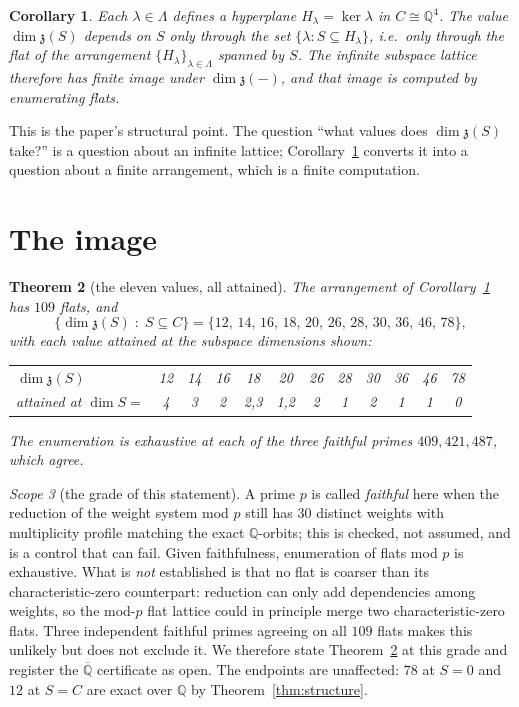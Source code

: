 \documentclass[11pt,a4paper]{article}
\newtheorem{theorem}{Theorem}[section]
\newtheorem{corollary}[theorem]{Corollary}
\theoremstyle{definition}
\theoremstyle{remark}
\newtheorem{scope}[theorem]{Scope}
\newcommand{\z}{\mathfrak{z}}
\newcommand{\Q}{\mathbb{Q}}
\begin{document}
\begin{corollary}\label{cor:arrangement}
Each $\lambda\in\Lambda$ defines a hyperplane $H_\lambda=\ker\lambda$ in $C\cong\Q^4$. The
value $\dim\z(S)$ depends on $S$ only through the set $\{\lambda:S\subseteq H_\lambda\}$, i.e.\
only through the flat of the arrangement $\{H_\lambda\}_{\lambda\in\Lambda}$ spanned by $S$.
The infinite subspace lattice therefore has finite image under $\dim\z(-)$, and that image is
computed by enumerating flats.
\end{corollary}

This is the paper's structural point. The question ``what values does $\dim\z(S)$ take?'' is a
question about an infinite lattice; Corollary~\ref{cor:arrangement} converts it into a question
about a finite arrangement, which is a finite computation.

\section{The image}\label{sec:image}

\begin{theorem}[the eleven values, all attained]\label{thm:spectrum}
The arrangement of Corollary~\ref{cor:arrangement} has $109$ flats, and
\[
   \bigl\{\dim\z(S)\;:\;S\subseteq C\bigr\}
   =\{12,\,14,\,16,\,18,\,20,\,26,\,28,\,30,\,36,\,46,\,78\},
\]
with each value attained at the subspace dimensions shown:
\begin{center}
\begin{tabular}{@{}lccccccccccc@{}}
\toprule
$\dim\z(S)$      & 12 & 14 & 16 & 18 & 20 & 26 & 28 & 30 & 36 & 46 & 78\\
attained at $\dim S=$ & 4 & 3 & 2 & 2,3 & 1,2 & 2 & 1 & 2 & 1 & 1 & 0\\
\bottomrule
\end{tabular}
\end{center}
The enumeration is exhaustive at each of the three faithful primes $409,421,487$, which agree.
\end{theorem}

\begin{scope}[the grade of this statement]\label{sc:primes}
A prime $p$ is called \emph{faithful} here when the reduction of the weight system mod $p$ still
has $30$ distinct weights with multiplicity profile matching the exact $\Q$-orbits; this is
checked, not assumed, and is a control that can fail. Given faithfulness, enumeration of flats
mod $p$ is exhaustive. What is \emph{not} established is that no flat is coarser than its
characteristic-zero counterpart: reduction can only add dependencies among weights, so the mod-$p$
flat lattice could in principle merge two characteristic-zero flats. Three independent faithful
primes agreeing on all $109$ flats makes this unlikely but does not exclude it. We therefore
state Theorem~\ref{thm:spectrum} at this grade and register the $\overline{\Q}$ certificate as
open. The endpoints are unaffected: $78$ at $S=0$ and $12$ at $S=C$ are exact over $\Q$ by
Theorem~\ref{thm:structure}.
\end{scope}
\end{document}
